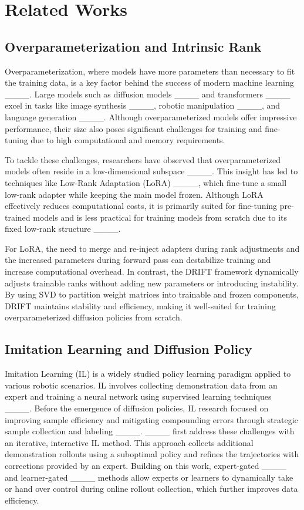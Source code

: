 \section{Related Works}
\label{sec:related_works}

\subsection{Overparameterization and Intrinsic Rank}
\label{sec:overparam_and_rank}
Overparameterization, where models have more parameters than necessary to fit the training data, is a key factor behind the success of modern machine learning ____. Large models such as diffusion models ____ and transformers ____ excel in tasks like image synthesis ____, robotic manipulation ____, and language generation ____. Although overparameterized models offer impressive performance, their size also poses significant challenges for training and fine-tuning due to high computational and memory requirements.

To tackle these challenges, researchers have observed that overparameterized models often reside in a low-dimensional subspace ____. This insight has led to techniques like Low-Rank Adaptation (LoRA) ____, which fine-tune a small low-rank adapter while keeping the main model frozen. Although LoRA effectively reduces computational costs, it is primarily suited for fine-tuning pre-trained models and is less practical for training models from scratch due to its fixed low-rank structure ____.

For LoRA, the need to merge and re-inject adapters during rank adjustments and the increased parameters during forward pass can destabilize training and increase computational overhead. In contrast, the DRIFT framework dynamically adjusts trainable ranks without adding new parameters or introducing instability. By using SVD to partition weight matrices into trainable and frozen components, DRIFT maintains stability and efficiency, making it well-suited for training overparameterized diffusion policies from scratch.

\subsection{Imitation Learning and Diffusion Policy}
\label{sec:il_dp}

Imitation Learning (IL) is a widely studied policy learning paradigm applied to various robotic scenarios. IL involves collecting demonstration data from an expert and training a neural network using supervised learning techniques ____. Before the emergence of diffusion policies, IL research focused on improving sample efficiency and mitigating compounding errors through strategic sample collection and labeling ____. ____ first address these challenges with an iterative, interactive IL method. This approach collects additional demonstration rollouts using a suboptimal policy and refines the trajectories with corrections provided by an expert. Building on this work, expert-gated ____ and learner-gated ____ methods allow experts or learners to dynamically take or hand over control during online rollout collection, which further improves data efficiency.

